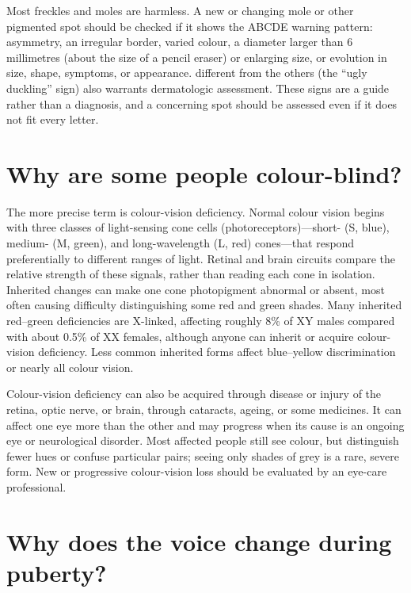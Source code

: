 \documentclass[11pt,oneside]{report}
\begin{document}
Most freckles and moles are harmless. A new or changing mole or other pigmented
spot should be checked if it shows the ABCDE warning pattern: asymmetry, an
irregular border, varied colour, a diameter larger than 6 millimetres (about
the size of a pencil eraser) or enlarging size, or evolution in size, shape,
symptoms, or appearance.
different from the others (the ``ugly duckling'' sign) also warrants
dermatologic assessment. These signs are a guide rather than a diagnosis, and a
concerning spot should be assessed even if it does not fit every letter.

\section{Why are some people colour-blind?}

The more precise term is colour-vision deficiency. Normal colour vision begins
with three classes of light-sensing cone cells (photoreceptors)---short- (S,
blue), medium- (M, green), and long-wavelength (L, red) cones---that respond
preferentially to different ranges of light. Retinal and brain circuits compare
the relative strength of these signals, rather than reading each cone in
isolation. Inherited changes can make one cone photopigment abnormal or absent,
most often causing difficulty distinguishing some red and green shades. Many
inherited red--green deficiencies are X-linked, affecting roughly 8\% of XY
males compared with about 0.5\% of XX females, although anyone can inherit or
acquire colour-vision deficiency.
Less common inherited forms affect blue--yellow discrimination or nearly all
colour vision.

Colour-vision deficiency can also be acquired through disease or injury of the
retina, optic nerve, or brain, through cataracts, ageing, or some medicines. It
can affect one eye more than the other and may progress when its cause is an
ongoing eye or neurological disorder.
Most affected people still see colour, but distinguish fewer hues or confuse
particular pairs; seeing only shades of grey is a rare, severe form. New or
progressive colour-vision loss should be evaluated by an eye-care professional.

\section{Why does the voice change during puberty?}
\end{document}

